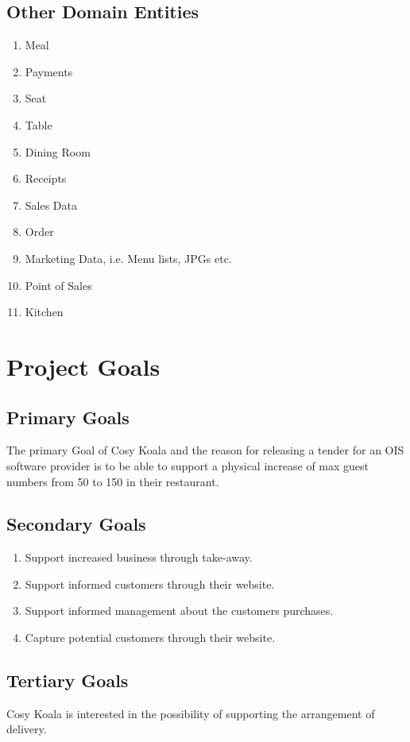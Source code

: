 \documentclass{article}
\begin{document}
\subsection{Other Domain Entities}
\begin{enumerate}
    \item Meal
    \item Payments
    \item Seat
    \item Table
    \item Dining Room
    \item Receipts
    \item Sales Data
    \item Order
    \item Marketing Data, i.e. Menu lists, JPGs etc.
    \item Point of Sales
    \item Kitchen
\end{enumerate}


\section{Project Goals}
\subsection{Primary Goals}
The primary Goal of Cosy Koala and the reason for releasing a tender for an OIS software provider is to be able to support a physical increase of max guest numbers from 50 to 150 in their restaurant.
\subsection{Secondary Goals}
\begin{enumerate}
    \item Support increased business through take-away.
    \item Support informed customers through their website.
    \item Support informed management about the customers purchases.
    \item Capture potential customers through their website.
\end{enumerate}
\subsection{Tertiary Goals}
Cosy Koala is interested in the possibility of supporting the arrangement of delivery.
\end{document}
